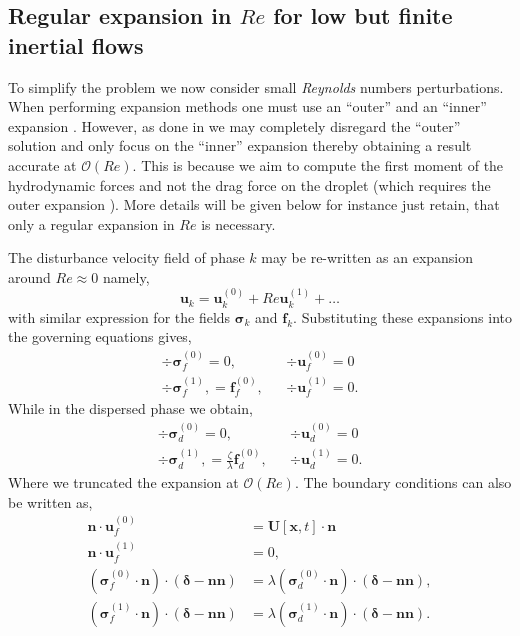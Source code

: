 \subsection{Regular expansion in $Re$ for low but finite inertial flows}

To simplify the problem we now consider small \textit{Reynolds} numbers perturbations. 
When performing expansion methods one must use an ``outer'' and an ``inner'' expansion \citet{proudman1957expansions}. 
However, as done in \citet{stone2001inertial,raja2010inertial,jiang2021inertial} we may completely disregard the ``outer'' solution and only focus on the ``inner'' expansion thereby obtaining a result accurate at $\mathcal{O}(Re)$. 
This is because we aim to compute the first moment of the hydrodynamic forces and not the drag force on the droplet (which requires the outer expansion \citep{proudman1957expansions}). 
More details will be given below for instance just retain, that only a regular expansion in $Re$ is necessary.

The disturbance velocity field of phase $k$ may be re-written as an expansion around $Re \approx 0$ namely, 
\begin{equation*}
    \textbf{u}_k = \textbf{u}_k^{(0)} + Re \textbf{u}_k^{(1)} + \ldots
\end{equation*}
with similar expression for the fields $\bm\sigma_k$ and $\textbf{f}_k$. 
Substituting these expansions into the governing equations gives,
\begin{align}
    \div\bm\sigma_f^{(0)}
    = 0,
    && \div \textbf{u}_f^{(0)} = 0 
    \label{eq:zeroth_order_NS_f}
    \\
    \div\bm\sigma_f^{(1)},
    =  \textbf{f}_f^{(0)},
    && \div \textbf{u}_f^{(1)} = 0.  
    \label{eq:first_order_NS_f}
\end{align}
While in the dispersed phase we obtain, 
\begin{align}
    \div\bm\sigma_d^{(0)}
    = 0,
    && \div \textbf{u}_d^{(0)} = 0 
    \label{eq:zeroth_order_NS_d}
    \\
    \div\bm\sigma_d^{(1)},
    = \frac{\zeta}{\lambda} \textbf{f}_d^{(0)},
    && \div \textbf{u}_d^{(1)} = 0. 
    \label{eq:first_order_NS_f}
\end{align}
Where we truncated the expansion at $\mathcal{O}(Re)$.  
The boundary conditions can also be written as, 
\begin{align}
    \textbf{n}\cdot\textbf{u}_f^{(0)}
    &= \textbf{U}[\textbf{x},t]\cdot \textbf{n} \\
    \textbf{n}\cdot\textbf{u}_f^{(1)}
    &= 0, \\
    \label{eq:bc_non_inertia}
    (\bm\sigma_f^{(0)}\cdot\textbf{n})\cdot (\bm\delta - \textbf{nn})
    &= \lambda (\bm\sigma_d^{(0)}\cdot \textbf{n})\cdot (\bm\delta - \textbf{nn}),\\
    (\bm\sigma_f^{(1)}\cdot\textbf{n})\cdot (\bm\delta - \textbf{nn})
    &= \lambda (\bm\sigma_d^{(1)}\cdot \textbf{n})\cdot (\bm\delta - \textbf{nn}). 
    \label{eq:bc_inertial}
\end{align}


